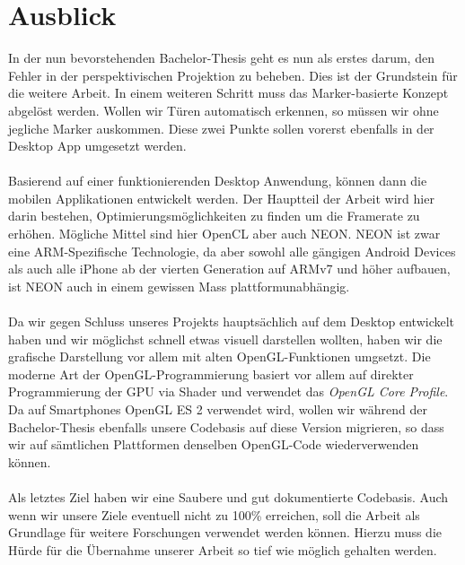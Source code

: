\documentclass[main.tex]{subfiles}
\begin{document}
\section{Ausblick}

In der nun bevorstehenden Bachelor-Thesis geht es nun als erstes darum, den Fehler in der perspektivischen Projektion zu beheben. Dies ist der Grundstein für die weitere Arbeit. In einem weiteren Schritt muss das Marker-basierte Konzept abgelöst werden. Wollen wir Türen automatisch erkennen, so müssen wir ohne jegliche Marker auskommen. Diese zwei Punkte sollen vorerst ebenfalls in der Desktop App umgesetzt werden.
\paragraph{}
Basierend auf einer funktionierenden Desktop Anwendung, können dann die mobilen Applikationen entwickelt werden. Der Hauptteil der Arbeit wird hier darin bestehen, Optimierungsmöglichkeiten zu finden um die Framerate zu erhöhen. Mögliche Mittel sind hier OpenCL aber auch NEON. NEON ist zwar eine ARM-Spezifische Technologie, da aber sowohl alle gängigen Android Devices als auch alle iPhone ab der vierten Generation auf ARMv7 und höher aufbauen, ist NEON auch in einem gewissen Mass plattformunabhängig.
\paragraph{}
Da wir gegen Schluss unseres Projekts hauptsächlich auf dem Desktop entwickelt haben und wir möglichst schnell etwas visuell darstellen wollten, haben wir die grafische Darstellung vor allem mit alten OpenGL-Funktionen umgsetzt. Die moderne Art der OpenGL-Programmierung basiert vor allem auf direkter Programmierung der GPU via Shader und verwendet das \textit{OpenGL Core Profile}. Da auf Smartphones OpenGL ES 2 verwendet wird, wollen wir während der Bachelor-Thesis ebenfalls unsere Codebasis auf diese Version migrieren, so dass wir auf sämtlichen Plattformen denselben OpenGL-Code wiederverwenden können.
\paragraph{}
Als letztes Ziel haben wir eine Saubere und gut dokumentierte Codebasis. Auch wenn wir unsere Ziele eventuell nicht zu 100\% erreichen, soll die Arbeit als Grundlage für weitere Forschungen verwendet werden können. Hierzu muss die Hürde für die Übernahme unserer Arbeit so tief wie möglich gehalten werden.
\end{document}
